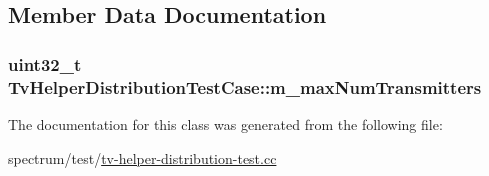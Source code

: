 \subsection{Member Data Documentation}
\subsubsection[{\texorpdfstring{m\+\_\+max\+Num\+Transmitters}{m_maxNumTransmitters}}]{\setlength{\rightskip}{0pt plus 5cm}uint32\+\_\+t Tv\+Helper\+Distribution\+Test\+Case\+::m\+\_\+max\+Num\+Transmitters\hspace{0.3cm}{\ttfamily [private]}}\hypertarget{classTvHelperDistributionTestCase_ae226743c2fe9b0e15245b5a7be57db20}{}\label{classTvHelperDistributionTestCase_ae226743c2fe9b0e15245b5a7be57db20}


The documentation for this class was generated from the following file\+:\begin{DoxyCompactItemize}
\item 
spectrum/test/\hyperlink{tv-helper-distribution-test_8cc}{tv-\/helper-\/distribution-\/test.\+cc}\end{DoxyCompactItemize}
